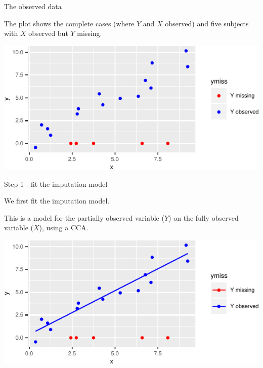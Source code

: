 \documentclass[ignorenonframetext,]{beamer}
\begin{document}
\begin{frame}{The observed data}
\protect\hypertarget{the-observed-data}{}

The plot shows the complete cases (where \(Y\) and \(X\) observed) and
five subjects with \(X\) observed but \(Y\) missing.

\begin{center}\includegraphics{Lecture2_files/figure-beamer/unnamed-chunk-14-1} \end{center}

\end{frame}

\begin{frame}{Step 1 - fit the imputation model}
\protect\hypertarget{step-1---fit-the-imputation-model}{}

We first fit the imputation model.

This is a model for the partially observed variable (\(Y\)) on the fully
observed variable (\(X\)), using a CCA.

\begin{center}\includegraphics{Lecture2_files/figure-beamer/unnamed-chunk-15-1} \end{center}

\end{frame}
\end{document}
